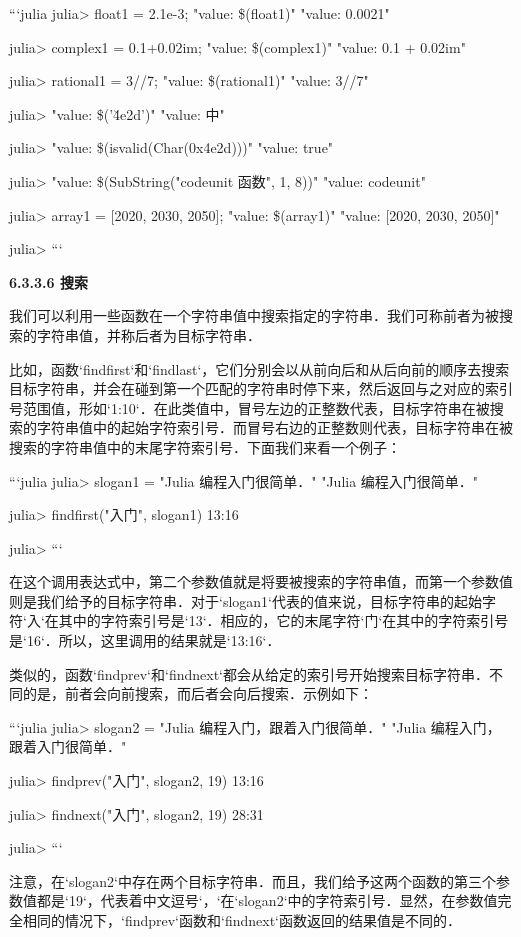 ```julia
julia> float1 = 2.1e-3; "value: \$(float1)"
"value: 0.0021"

julia> complex1 = 0.1+0.02im; "value: \$(complex1)"
"value: 0.1 + 0.02im"

julia> rational1 = 3//7; "value: \$(rational1)"
"value: 3//7"

julia> "value: \$('\u4e2d')"
"value: 中"

julia> "value: \$(isvalid(Char(0x4e2d)))"
"value: true"

julia> "value: \$(SubString("codeunit 函数", 1, 8))"
"value: codeunit"

julia> array1 = [2020, 2030, 2050]; "value: \$(array1)"
"value: [2020, 2030, 2050]"

julia> 
```

\textbf{6.3.3.6 搜索}

我们可以利用一些函数在一个字符串值中搜索指定的字符串．我们可称前者为被搜索的字符串值，并称后者为目标字符串．

比如，函数`findfirst`和`findlast`，它们分别会以从前向后和从后向前的顺序去搜索目标字符串，并会在碰到第一个匹配的字符串时停下来，然后返回与之对应的索引号范围值，形如`1:10`．在此类值中，冒号左边的正整数代表，目标字符串在被搜索的字符串值中的起始字符索引号．而冒号右边的正整数则代表，目标字符串在被搜索的字符串值中的末尾字符索引号．下面我们来看一个例子：

```julia
julia> slogan1 = "Julia 编程入门很简单．"
"Julia 编程入门很简单．"

julia> findfirst("入门", slogan1)
13:16

julia> 
```

在这个调用表达式中，第二个参数值就是将要被搜索的字符串值，而第一个参数值则是我们给予的目标字符串．对于`slogan1`代表的值来说，目标字符串的起始字符`入`在其中的字符索引号是`13`．相应的，它的末尾字符`门`在其中的字符索引号是`16`．所以，这里调用的结果就是`13:16`．

类似的，函数`findprev`和`findnext`都会从给定的索引号开始搜索目标字符串．不同的是，前者会向前搜索，而后者会向后搜索．示例如下：

```julia
julia> slogan2 = "Julia 编程入门，跟着入门很简单．"
"Julia 编程入门，跟着入门很简单．"

julia> findprev("入门", slogan2, 19)
13:16

julia> findnext("入门", slogan2, 19)
28:31

julia> 
```

注意，在`slogan2`中存在两个目标字符串．而且，我们给予这两个函数的第三个参数值都是`19`，代表着中文逗号`，`在`slogan2`中的字符索引号．显然，在参数值完全相同的情况下，`findprev`函数和`findnext`函数返回的结果值是不同的．

